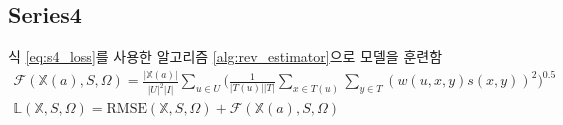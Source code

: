 \subsection{Series4}
\hspace{0.5cm} 식 \eqref{eq:s4_loss}를 사용한 알고리즘 \ref{alg:rev_estimator}으로 모델을 훈련함
\begin{gather}
\mathcal{F}(\mathbb{X}(a), S, \Omega)= \frac{|\mathbb{X}(a)|}{|U|^{2} |I|} \sum_{u \in U}\big( \frac{1}{|T(u)||T|} \sum_{x \in T(u)} \sum_{y \in T} \left( w(u,x,y)s(x,y) \right)^{2} \big)^{0.5} \nonumber \\
\mathbb{L}(\mathbb{X}, S, \Omega)=\text{RMSE}(\mathbb{X}, S, \Omega) + \mathcal{F}(\mathbb{X}(a), S, \Omega) \label{eq:s4_loss}
\end{gather}